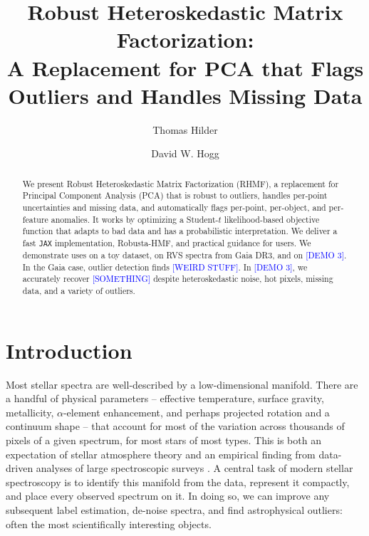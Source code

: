\documentclass[onecolumn,floatfix]{aastex631}
\newcommand{\hogg}[1]{\textcolor{red}{\textbf{DWH says:} #1}}
\newcommand{\placeholder}[1]{\textcolor{blue}{[#1]}}
\begin{document}
\title{Robust Heteroskedastic Matrix Factorization: \\
  A Replacement for PCA that Flags Outliers and Handles Missing Data}
\author[0000-0001-7641-5235]{Thomas Hilder}
\author[0000-0003-2866-9403]{David W. Hogg}

\begin{abstract}
  We present Robust Heteroskedastic Matrix Factorization (RHMF), a replacement for Principal Component Analysis (PCA) that is robust to outliers, handles per-point uncertainties and missing data, and automatically flags per-point, per-object, and per-feature anomalies.
  It works by optimizing a Student-$t$ likelihood-based objective function that adapts to bad data and has a probabilistic interpretation.
  We deliver a fast \texttt{JAX} implementation, Robusta-HMF, and practical guidance for users.
  We demonstrate uses on a toy dataset, on RVS spectra from Gaia DR3, and on \placeholder{DEMO 3}.
  In the Gaia case, outlier detection finds \placeholder{WEIRD STUFF}.
  In \placeholder{DEMO 3}, we accurately recover \placeholder{SOMETHING} despite heteroskedastic noise, hot pixels, missing data, and a variety of outliers.
\end{abstract}

\section{Introduction}

Most stellar spectra are well-described by a low-dimensional manifold. There are a handful of physical parameters -- effective temperature, surface gravity, metallicity, $\alpha$-element enhancement, and perhaps projected rotation and a continuum shape -- that account for most of the variation across thousands of pixels of a given spectrum, for most stars of most types. This is both an expectation of stellar atmosphere theory \citep{hubeny2014} and an empirical finding from data-driven analyses of large spectroscopic surveys \citep[e.g.][]{ness2015, casey2016, ting2019}. A central task of modern stellar spectroscopy is to identify this manifold from the data, represent it compactly, and place every observed spectrum on it. In doing so, we can improve any subsequent label estimation, de-noise spectra, and find astrophysical outliers: often the most scientifically interesting objects.\\
\end{document}
